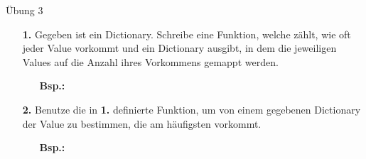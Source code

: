 \begin{frame}{Übung 3}
	\begin{itemize}
		\item[\textbf{1.}] Gegeben ist ein Dictionary. Schreibe eine Funktion, welche zählt, wie oft jeder Value vorkommt und ein Dictionary ausgibt, in dem die jeweiligen Values auf die Anzahl ihres Vorkommens gemappt werden.
		\begin{itemize}
			\item[\textbf{Bsp.:}]
		\end{itemize}
	
		\item[\textbf{2.}] Benutze die in \textbf{1.} definierte Funktion, um von einem gegebenen Dictionary der Value zu bestimmen, die am häufigsten vorkommt.
		\begin{itemize}
			\item[\textbf{Bsp.:}]
		\end{itemize}
	
		
	\end{itemize}
\end{frame}



